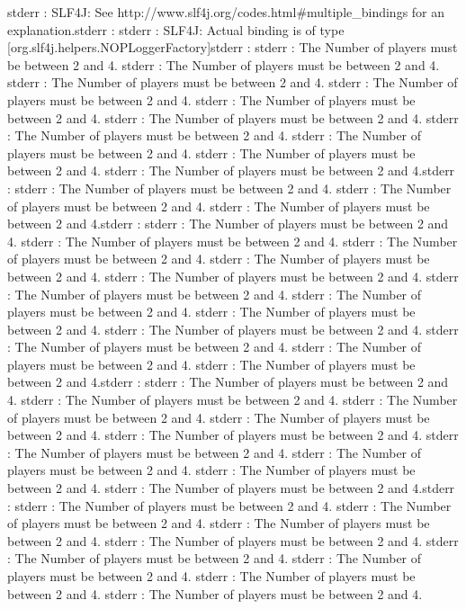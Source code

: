 stderr  : SLF4J: See http://www.slf4j.org/codes.html#multiple_bindings for an explanation.stderr  : 
stderr  : SLF4J: Actual binding is of type [org.slf4j.helpers.NOPLoggerFactory]stderr  : 
stderr  : The Number of players must be between 2 and 4.
stderr  : The Number of players must be between 2 and 4.
stderr  : The Number of players must be between 2 and 4.
stderr  : The Number of players must be between 2 and 4.
stderr  : The Number of players must be between 2 and 4.
stderr  : The Number of players must be between 2 and 4.
stderr  : The Number of players must be between 2 and 4.
stderr  : The Number of players must be between 2 and 4.
stderr  : The Number of players must be between 2 and 4.
stderr  : The Number of players must be between 2 and 4.stderr  : 
stderr  : The Number of players must be between 2 and 4.
stderr  : The Number of players must be between 2 and 4.
stderr  : The Number of players must be between 2 and 4.stderr  : 
stderr  : The Number of players must be between 2 and 4.
stderr  : The Number of players must be between 2 and 4.
stderr  : The Number of players must be between 2 and 4.
stderr  : The Number of players must be between 2 and 4.
stderr  : The Number of players must be between 2 and 4.
stderr  : The Number of players must be between 2 and 4.
stderr  : The Number of players must be between 2 and 4.
stderr  : The Number of players must be between 2 and 4.
stderr  : The Number of players must be between 2 and 4.
stderr  : The Number of players must be between 2 and 4.
stderr  : The Number of players must be between 2 and 4.
stderr  : The Number of players must be between 2 and 4.stderr  : 
stderr  : The Number of players must be between 2 and 4.
stderr  : The Number of players must be between 2 and 4.
stderr  : The Number of players must be between 2 and 4.
stderr  : The Number of players must be between 2 and 4.
stderr  : The Number of players must be between 2 and 4.
stderr  : The Number of players must be between 2 and 4.
stderr  : The Number of players must be between 2 and 4.
stderr  : The Number of players must be between 2 and 4.
stderr  : The Number of players must be between 2 and 4.stderr  : 
stderr  : The Number of players must be between 2 and 4.
stderr  : The Number of players must be between 2 and 4.
stderr  : The Number of players must be between 2 and 4.
stderr  : The Number of players must be between 2 and 4.
stderr  : The Number of players must be between 2 and 4.
stderr  : The Number of players must be between 2 and 4.
stderr  : The Number of players must be between 2 and 4.
stderr  : The Number of players must be between 2 and 4.
